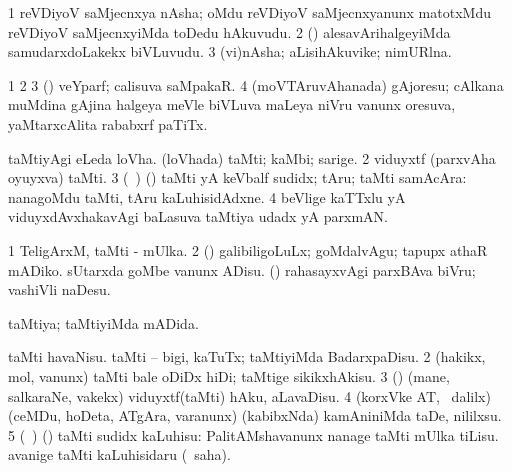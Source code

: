 {{{{{{\bentry
{}
  \gl{\nA}\bmng
\bnum
\num{1} reVDiyoV saMjecnxya nAsha; oMdu reVDiyoV saMjecnxyanunx matotxMdu reVDiyoV saMjecnxyiMda toDedu hAkuvudu. 
\num{2} (\ashi) alesavArihalgeyiMda  samudarxdoLakekx biVLuvudu. 
\num{3} (vi)nAsha; aLisihAkuvike; nimURlna. 
\enum
\emng
\eentry

\bentry
{}
  \gl{\nA}\bmng
\bnum
\num{1}  
\num{2}  
\num{3} (\viduyx) veYparf; calisuva saMpakaR. 
\num{4} (moVTAruvAhanada) gAjoresu; cAlkana muMdina gAjina halgeya meVle biVLuva maLeya niVru \mo vanunx oresuva, yaMtarxcAlita rababxrf paTiTx. 
\enum
\emng
\eentry

\bentry
{}
 \gl{\saMkiSx}\bmng
{} 
\emng
\eentry

\bentry
{} 
\gl{\nA}
\expl{}
\bmng
\bnum
{} 
\banum
{} taMtiyAgi eLeda loVha. 
 (loVhada) taMti; kaMbi; sarige. 
\eanum
\numie
\num{2} viduyxtf (parxvAha oyuyxva) taMti. 
\num{3} (\kanmu\ \ame) (\AmA) taMti yA keVbalf sudidx; tAru; taMti samAcAra:  nanagoMdu taMti, tAru kaLuhisidAdxne. 
\num{4} beVlige kaTTxlu yA viduyxdAvxhakavAgi baLasuva taMtiya udadx yA parxmAN. 
\enum
\emng

\noindent
\gl{\pagu}
\bmng
\bnum
\num{1}  TeligArxM, taMti - mUlka. 
\num{2}  (\rUpa) galibiligoLuLx; goMdalvAgu; tapupx athaR mADiko. 
  
\banum
{} sUtarxda goMbe \mo vanunx ADisu. 
 (\rUpa) rahasayxvAgi parxBAva biVru; vashiVli naDesu. 
\eanum
\numie
\enum
\emng
\eentry

\bentry
{} 
\gl{\gu}
\bmng
taMtiya; taMtiyiMda mADida. 
\emng
\eentry

\bentry
{} 
\gl{\sakirx}
\bmng
\bnum
{} 
\banum
{} taMti havaNisu. 
 taMti -- bigi, kaTuTx; taMtiyiMda BadarxpaDisu. 
\eanum
\numie
\num{2} (hakikx, mol, \mo vanunx) taMti bale oDiDx hiDi; taMtige sikikxhAkisu. 
\num{3} (\viduyx) (mane, salkaraNe, \mo vakekx) viduyxtf(taMti) hAku, aLavaDisu. 
\num{4} (korxVke AT, \sA\, \BUkaq dalilx) (ceMDu, hoDeta, ATgAra, \mo varanunx) (kabibxNda) kamAniniMda taDe, nililxsu. 
\num{5} (\kanmu\ \ame) (\AmA) taMti sudidx kaLuhisu:  PalitAMshavanunx nanage taMti mUlka tiLisu.  avanige taMti kaLuhisidaru (\akirx\ saha). 
\enum
\emng
\eentry

}}}}}}
